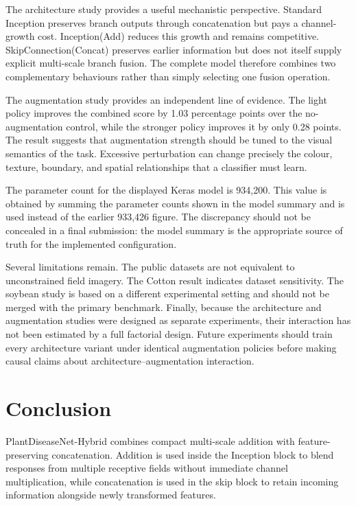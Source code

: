 \documentclass[a4paper,fleqn]{cas-dc}
\begin{document}
The architecture study provides a useful mechanistic perspective. Standard Inception preserves branch outputs through concatenation but pays a channel-growth cost. Inception(Add) reduces this growth and remains competitive. SkipConnection(Concat) preserves earlier information but does not itself supply explicit multi-scale branch fusion. The complete model therefore combines two complementary behaviours rather than simply selecting one fusion operation.

The augmentation study provides an independent line of evidence. The light policy improves the combined score by 1.03 percentage points over the no-augmentation control, while the stronger policy improves it by only 0.28 points. The result suggests that augmentation strength should be tuned to the visual semantics of the task. Excessive perturbation can change precisely the colour, texture, boundary, and spatial relationships that a classifier must learn.

The parameter count for the displayed Keras model is 934,200. This value is obtained by summing the parameter counts shown in the model summary and is used instead of the earlier 933,426 figure. The discrepancy should not be concealed in a final submission: the model summary is the appropriate source of truth for the implemented configuration.

Several limitations remain. The public datasets are not equivalent to unconstrained field imagery. The Cotton result indicates dataset sensitivity. The soybean study is based on a different experimental setting and should not be merged with the primary benchmark. Finally, because the architecture and augmentation studies were designed as separate experiments, their interaction has not been estimated by a full factorial design. Future experiments should train every architecture variant under identical augmentation policies before making causal claims about architecture--augmentation interaction.

\section{Conclusion}
PlantDiseaseNet-Hybrid combines compact multi-scale addition with feature-preserving concatenation. Addition is used inside the Inception block to blend responses from multiple receptive fields without immediate channel multiplication, while concatenation is used in the skip block to retain incoming information alongside newly transformed features.
\end{document}
